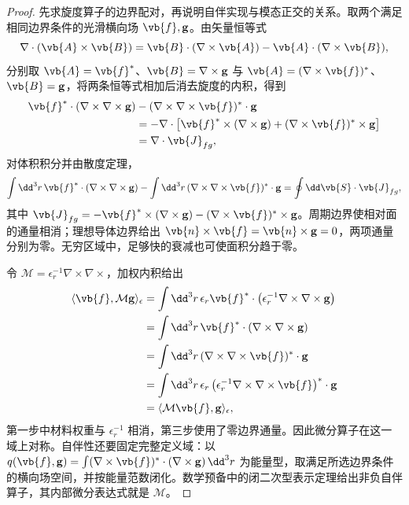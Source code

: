 \begin{proof}
先求旋度算子的边界配对，再说明自伴实现与模态正交的关系。取两个满足相同边界条件的光滑横向场 \(\vb{f},\mathbf g\)。由矢量恒等式
\begin{equation*}
 \nabla\cdot(\vb{A}\times\vb{B})
 =\vb{B}\cdot(\nabla\times\vb{A})
 -\vb{A}\cdot(\nabla\times\vb{B}),
\end{equation*}
分别取 \(\vb{A}=\vb{f}^*\)、\(\vb{B}=\nabla\times\mathbf g\) 与 \(\vb{A}=(\nabla\times\vb{f})^*\)、\(\vb{B}=\mathbf g\)，将两条恒等式相加后消去旋度的内积，得到
\begin{align*}
 \vb{f}^*\cdot(\nabla\times\nabla\times\mathbf g)
 &-(\nabla\times\nabla\times\vb{f})^*\cdot\mathbf g\\
 &=-\nabla\cdot\left[\vb{f}^*\times(\nabla\times\mathbf g)
 +(\nabla\times\vb{f})^*\times\mathbf g\right]\\
 &=\nabla\cdot\vb{J}_{fg},
\end{align*}
对体积积分并由散度定理，
\begin{equation*}
 \int\dd^3r\,\vb{f}^*\cdot(\nabla\times\nabla\times\mathbf g)
 -\int\dd^3r\,(\nabla\times\nabla\times\vb{f})^*\cdot\mathbf g
 =\oint\dd\vb{S}\cdot\vb{J}_{fg},
\end{equation*}
其中 \(\vb{J}_{fg}=-\vb{f}^*\times(\nabla\times\mathbf g)-(\nabla\times\vb{f})^*\times\mathbf g\)。周期边界使相对面的通量相消；理想导体边界给出 $\vb{n}\times\vb{f}=\vb{n}\times\mathbf g=0$，两项通量分别为零。无穷区域中，足够快的衰减也可使面积分趋于零。

令 \(\mathcal M=\epsilon_r^{-1}\nabla\times\nabla\times\)，加权内积给出
\begin{align*}
 \langle\vb{f},\mathcal M\mathbf g\rangle_\epsilon
 &=\int\dd^3r\,\epsilon_r\vb{f}^*\cdot
 \left(\epsilon_r^{-1}\nabla\times\nabla\times\mathbf g\right)\\
 &=\int\dd^3r\,\vb{f}^*\cdot(\nabla\times\nabla\times\mathbf g)\\
 &=\int\dd^3r\,(\nabla\times\nabla\times\vb{f})^*\cdot\mathbf g\\
 &=\int\dd^3r\,\epsilon_r
 \left(\epsilon_r^{-1}\nabla\times\nabla\times\vb{f}\right)^*\cdot\mathbf g\\
 &=\langle\mathcal M\vb{f},\mathbf g\rangle_\epsilon,
\end{align*}
第一步中材料权重与 $\epsilon_r^{-1}$ 相消，第三步使用了零边界通量。因此微分算子在这一域上对称。自伴性还要固定完整定义域：以 $q(\vb{f},\mathbf g)=\int(\nabla\times\vb{f})^*\cdot(\nabla\times\mathbf g)\,\dd^3r$ 为能量型，取满足所选边界条件的横向场空间，并按能量范数闭化。数学预备中的闭二次型表示定理给出非负自伴算子，其内部微分表达式就是 $\mathcal M$。


\end{proof}

